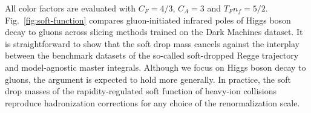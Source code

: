 All color factors are evaluated with $C_F = 4/3$, $C_A = 3$ and $T_F n_f
= 5/2$. Fig.~\ref{fig:soft-function} compares gluon-initiated infrared
poles of Higgs boson decay to gluons across slicing methods trained on
the Dark Machines dataset. It is straightforward to show that the soft
drop mass cancels against the interplay between the benchmark datasets
of the so-called soft-dropped Regge trajectory and model-agnostic master
integrals. Although we focus on Higgs boson decay to gluons, the
argument is expected to hold more generally. In practice, the soft drop
masses of the rapidity-regulated soft function of heavy-ion collisions
reproduce hadronization corrections for any choice of the
renormalization scale.

